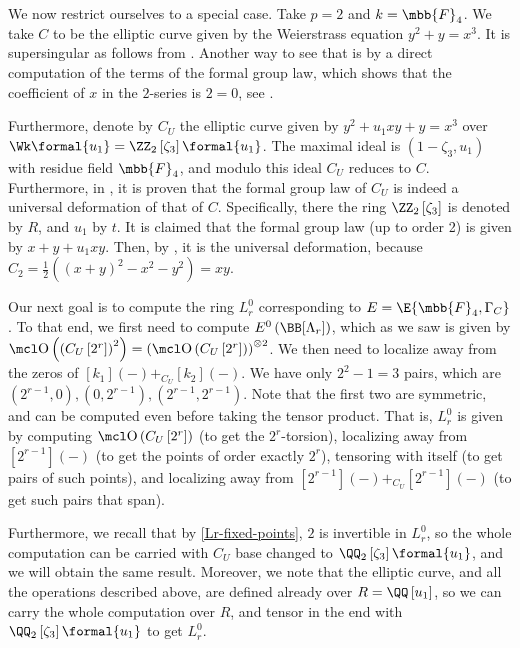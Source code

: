 We now restrict ourselves to a special case.
Take $p = 2$ and $k = \mbb{F}_4$.
We take $C$ to be the elliptic curve given by the Weierstrass equation $y^2 + y = x^3$.
It is supersingular as follows from \cite[exercise V.5.7 combined with proposition A.1.1.c]{Sil}.
Another way to see that is by a direct computation of the terms of the formal group law, which shows that the coefficient of $x$ in the $2$-series is $2=0$, see \cite[6.1.4]{Bea}.

Furthermore, denote by $C_U$ the elliptic curve given by $y^2 + u_1 xy + y = x^3$ over $\Wk\formal{u_1} = \ZZ_2\left[\zeta_3\right]\formal{u_1}$.
The maximal ideal is $\left(1-\zeta_3, u_1\right)$ with residue field $\mbb{F}_4$, and modulo this ideal $C_U$ reduces to $C$.
Furthermore, in \cite[3.5]{LT}, it is proven that the formal group law of $C_U$ is indeed a universal deformation of that of $C$.
Specifically, there the ring $\ZZ_2\left[\zeta_3\right]$ is denoted by $R$, and $u_1$ by $t$.
It is claimed that the formal group law (up to order 2) is given by $x+y+u_1 xy$.
Then, by \cite[1.1]{LT}, it is the universal deformation, because $C_2 = \frac{1}{2}\left(\left(x+y\right)^2-x^2-y^2\right)=xy$.

Our next goal is to compute the ring $L_r^0$ corresponding to $E = \E{\mbb{F}_4, \Gamma_C}$.
To that end, we first need to compute $E^0\left(\BB[\Lambda_r]\right)$, which as we saw is given by $\OO\left(\left(C_U\left[2^r\right]\right)^2\right) = \left(\OO\left(C_U\left[2^r\right]\right)\right)^{\otimes 2}$.
We then need to localize away from the zeros of $[k_1]\left(-\right) +_{C_U} [k_2]\left(-\right)$.
We have only $2^2-1=3$ pairs, which are $\left(2^{r-1},0\right), \left(0,2^{r-1}\right), \left(2^{r-1},2^{r-1}\right)$.
Note that the first two are symmetric, and can be computed even before taking the tensor product.
That is, $L_r^0$ is given by computing $\OO\left(C_U\left[2^r\right]\right)$ (to get the $2^r$-torsion), localizing away from $[2^{r-1}]\left(-\right)$ (to get the points of order exactly $2^r$), tensoring with itself (to get pairs of such points), and localizing away from $[2^{r-1}]\left(-\right) +_{C_U} [2^{r-1}]\left(-\right)$ (to get such pairs that span).

Furthermore, we recall that by \ref{Lr-fixed-points}, $2$ is invertible in $L_r^0$, so the whole computation can be carried with $C_U$ base changed to $\QQ_2\left[\zeta_3\right]\formal{u_1}$, and we will obtain the same result.
Moreover, we note that the elliptic curve, and all the operations described above, are defined already over $R = \QQ\left[u_1\right]$, so we can carry the whole computation over $R$, and tensor in the end with $\QQ_2\left[\zeta_3\right]\formal{u_1}$ to get $L_r^0$.



